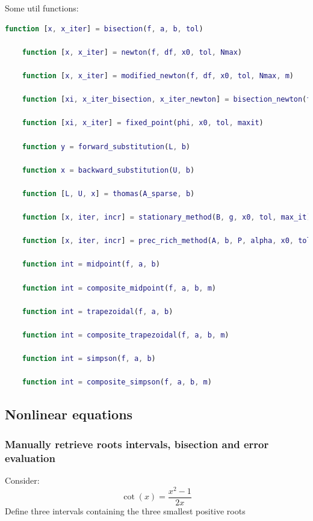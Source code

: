     Some util functions:
    \begin{lstlisting}[language=Matlab, escapeinside=`', gobble=4]
    function [x, x_iter] = bisection(f, a, b, tol)

    function [x, x_iter] = newton(f, df, x0, tol, Nmax)

    function [x, x_iter] = modified_newton(f, df, x0, tol, Nmax, m)

    function [xi, x_iter_bisection, x_iter_newton] = bisection_newton(f, df, a, b, tol_bisection, tol_newton, maxit_newton, multiplicity)

    function [xi, x_iter] = fixed_point(phi, x0, tol, maxit)

    function y = forward_substitution(L, b)

    function x = backward_substitution(U, b)

    function [L, U, x] = thomas(A_sparse, b)

    function [x, iter, incr] = stationary_method(B, g, x0, tol, max_it)

    function [x, iter, incr] = prec_rich_method(A, b, P, alpha, x0, tol, max_it)

    function int = midpoint(f, a, b)

    function int = composite_midpoint(f, a, b, m)

    function int = trapezoidal(f, a, b)

    function int = composite_trapezoidal(f, a, b, m)

    function int = simpson(f, a, b)

    function int = composite_simpson(f, a, b, m)
    \end{lstlisting}

\subsection{Nonlinear equations}
    \subsubsection{Manually retrieve roots intervals, bisection and error evaluation}
        Consider:
        $$
        \cot(x)=\frac{x^2-1}{2x}
        $$
        Define three intervals containing the three smallest positive roots
        
